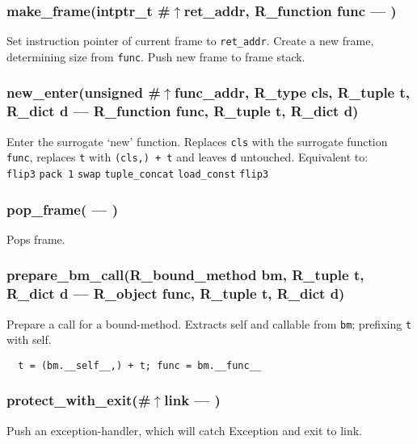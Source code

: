 \subsubsection{make\_frame(intptr\_t \#$\uparrow$ret\_addr, R\_function func --- ) }
\vspace{-1em}Set instruction pointer of current frame to \texttt{ret\_addr}. Create a new frame, determining size from \texttt{func}. Push new frame to frame stack. \vspace{-1em}
\subsubsection{new\_enter(unsigned \#$\uparrow$func\_addr, R\_type cls, R\_tuple t, R\_dict d --- R\_function func, R\_tuple t, R\_dict d)}
\vspace{-1em}Enter the surrogate `new' function. Replaces \texttt{cls} with the surrogate function \texttt{func}, replaces \texttt{t} with \texttt{(cls,) + t} and leaves \texttt{d} untouched. Equivalent to: \\ \texttt{flip3} \texttt{pack 1} \texttt{swap} \texttt{tuple\_concat} \texttt{load\_const} \texttt{flip3} \vspace{-1em}
\subsubsection{pop\_frame( --- )}
\vspace{-1em}Pops frame. \vspace{-1em}
\subsubsection{prepare\_bm\_call(R\_bound\_method bm, R\_tuple t, R\_dict d --- R\_object func, R\_tuple t, R\_dict d)}
\vspace{-1em}Prepare a call for a bound-method.  Extracts self and callable from \texttt{bm}; prefixing \texttt{t} with self. \vspace{-1em}\begin{verbatim}
  t = (bm.__self__,) + t; func = bm.__func__
\end{verbatim}
\vspace{-1em}\vspace{-1em}
\subsubsection{protect\_with\_exit(\#$\uparrow$link --- )}
\vspace{-1em}Push an exception-handler,  which will catch Exception and exit to link. \vspace{-1em}
